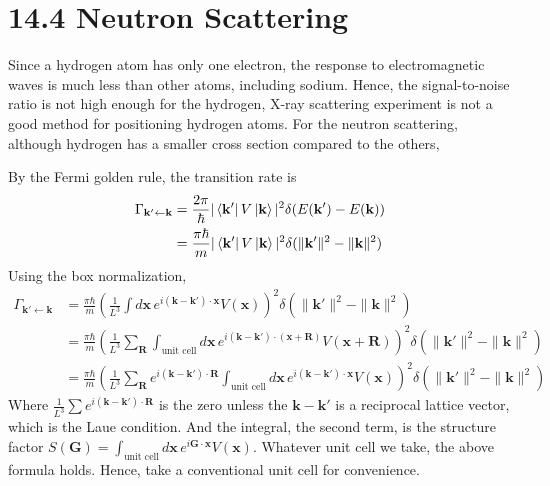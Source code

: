 \documentclass[a4paper,11pt]{article}
\begin{document}
\section{14.4 Neutron Scattering}

Since a hydrogen atom has only one electron, the response to electromagnetic waves is much less than other atoms, including sodium. Hence, the signal-to-noise ratio is not high enough for the hydrogen, X-ray scattering experiment is not a good method for positioning hydrogen atoms. For the neutron scattering, although hydrogen has a smaller cross section compared to the others,  

By the Fermi golden rule, the transition rate is
\begin{align}
    \Gamma_{\mathbf k'\leftarrow \mathbf k} 
    &= \frac{2\pi}{\hbar}|\bra{\mathbf k'}V\ket{\mathbf k}|^2\delta(E(\mathbf k')-E(\mathbf k)) \\
    &= \frac{\pi\hbar}{m}|\bra{\mathbf k'}V\ket{\mathbf k}|^2\delta(\|\mathbf k'\|^2-\|\mathbf k\|^2)
\end{align}
Using the box normalization,
\begin{align}
    \Gamma_{\mathbf k'\leftarrow \mathbf k} 
    &= \frac{\pi\hbar}{m}\left(\frac{1}{L^3}\int d\mathbf x\, e^{i(\mathbf k-\mathbf k')\cdot\mathbf x} V(\mathbf x)\right)^2\delta(\|\mathbf k'\|^2-\|\mathbf k\|^2) \\
    &= \frac{\pi\hbar}{m}\left(\frac{1}{L^3}\sum_{\mathbf R}\int_{\text{unit cell}} d\mathbf x\, e^{i(\mathbf k-\mathbf k')\cdot(\mathbf x+\mathbf R)} V(\mathbf x+\mathbf R)\right)^2\delta(\|\mathbf k'\|^2-\|\mathbf k\|^2) \\
    &= \frac{\pi\hbar}{m}\left(\frac{1}{L^3} \sum_{\mathbf R}e^{i(\mathbf k-\mathbf k')\cdot\mathbf R}\int_{\text{unit cell}} d\mathbf x\, e^{i(\mathbf k-\mathbf k')\cdot\mathbf x} V(\mathbf x)\right)^2\delta(\|\mathbf k'\|^2-\|\mathbf k\|^2)
\end{align}
Where $\frac{1}{L^3} \sum e^{i(\mathbf k-\mathbf k')\cdot\mathbf R}$ is the zero unless the $\mathbf k-\mathbf k'$ is a reciprocal lattice vector, which is the Laue condition. And the integral, the second term, is the structure factor $S(\mathbf G)=\int_{\text{unit cell}} d\mathbf x\, e^{i\mathbf G\cdot\mathbf x}V(\mathbf x)$. Whatever unit cell we take, the above formula holds. Hence, take a conventional unit cell for convenience.
\end{document}
